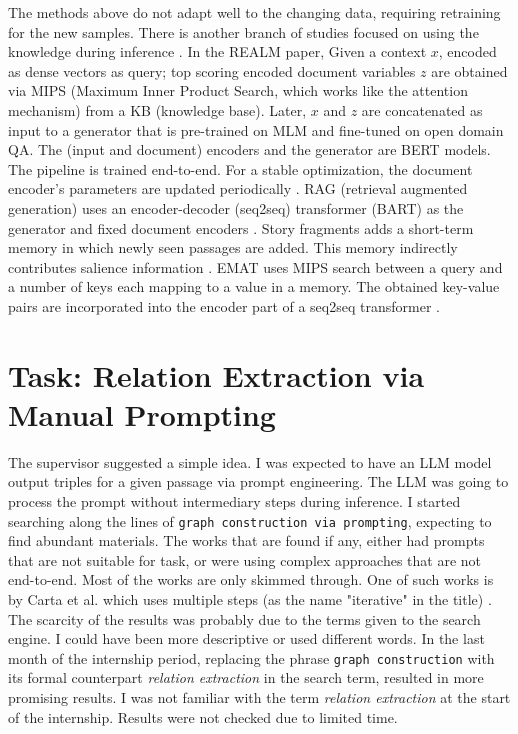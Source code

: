 \documentclass{article}
\begin{document}
The methods above do not adapt well to the changing data, requiring retraining for the new samples. There is another branch of studies focused on using the knowledge during inference \cite{pan_unifying_2024}. In the REALM paper, Given a context $x$, encoded as dense vectors as query; top scoring encoded document variables $z$ are obtained via MIPS (Maximum Inner Product Search, which works like the attention mechanism) from a KB (knowledge base). Later, $x$ and $z$ are concatenated as input to a generator that is pre-trained on MLM and fine-tuned on open domain QA. The (input and document) encoders and the generator are BERT models. The pipeline is trained end-to-end. For a stable optimization, the document encoder’s parameters are updated periodically \cite{guu_realm_2020}. RAG (retrieval augmented generation) uses an encoder-decoder (seq2seq) transformer (BART) as the generator and fixed document encoders \cite{lewis_retrieval-augmented_2021}. Story fragments adds a short-term memory in which newly seen passages are added. This memory indirectly contributes salience information \cite{wilmot_memory_2021}. EMAT uses MIPS search between a query and a number of keys each mapping to a value in a memory. The obtained key-value pairs are incorporated into the encoder part of a seq2seq transformer \cite{wu_efficient_2022}.
\section{Task: Relation Extraction via Manual Prompting}\label{relx_manual_prompt}
The supervisor suggested a simple idea. I was expected to have an LLM model output triples for a given passage via prompt engineering. The LLM was going to process the prompt without intermediary steps during inference. I started searching along the lines of \texttt{graph construction via prompting}, expecting to find abundant materials. The works that are found if any, either had prompts that are not suitable for task, or were using complex approaches that are not end-to-end. Most of the works are only skimmed through. One of such works is by Carta et al. which uses multiple steps (as the name "iterative" in the title) \cite{carta_iterative_2023}. The scarcity of the results was probably due to the terms given to the search engine. I could have been more descriptive or used different words. In the last month of the internship period, replacing the phrase \texttt{graph construction} with its formal counterpart \textit{relation extraction} in the search term, resulted in more promising results. I was not familiar with the term \textit{relation extraction} at the start of the internship. Results were not checked due to limited time.
\end{document}
